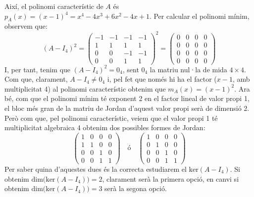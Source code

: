 \documentclass[11pt,a4paper]{article}
\begin{document}
        Així, el polinomi característic de $A$ és $p_A(x)=(x-1)^4=x^4-4x^3+6x^2-4x+1$.
        Per calcular el polinomi mínim, observem que:
        \begin{equation*}
            (A-I_4)^2=\begin{pmatrix}
            -1 & -1 & -1 & -1\\
            1 & 1 & 1 & 1\\
            0 & 0 & -1 & -1\\
            0 & 0 & 1 & 1
            \end{pmatrix}^2=\begin{pmatrix}
            0 & 0 & 0 & 0\\
            0 & 0 & 0 & 0\\
            0 & 0 & 0 & 0\\
            0 & 0 & 0 & 0
            \end{pmatrix}
        \end{equation*}
        I, per tant, tenim que $(A-I_4)^2=0_4$, sent $0_4$ la matriu nul·la de mida $4\times4$. Com que, clarament, $A-I_4\ne 0_4$ i, pel fet que només hi ha el factor ($x-1$, amb multiplicitat 4) al polinomi característic obtenim que $m_A(x)=(x-1)^2$. Ara bé, com que el polinomi mínim té exponent 2 en el factor lineal de valor propi 1, el bloc més gran de la matriu de Jordan d'aquest valor propi serà de dimensió 2. Però com que, pel polinomi característic, veiem que el valor propi 1 té multiplicitat algebraica 4 obtenim dos possibles formes de Jordan:
        \begin{equation*}
            \begin{pmatrix}
            1 & 0 & 0 & 0\\
            1 & 1 & 0 & 0\\
            0 & 0 & 1 & 0\\
            0 & 0 & 1 & 1
            \end{pmatrix}\quad\text{ó}\quad\begin{pmatrix}
            1 & 0 & 0 & 0\\
            0 & 1 & 0 & 0\\
            0 & 0 & 1 & 0\\
            0 & 0 & 1 & 1
            \end{pmatrix}
        \end{equation*}
    Per saber quina d'aquestes dues és la correcta estudiarem el $\text{ker}(A-I_4)$. Si obtenim $\text{dim(ker}(A-I_4))=2$, clarament serà la primera opció, en canvi si obtenim $\text{dim(ker}(A-I_4))=3$ serà la segona opció.
\end{document}
